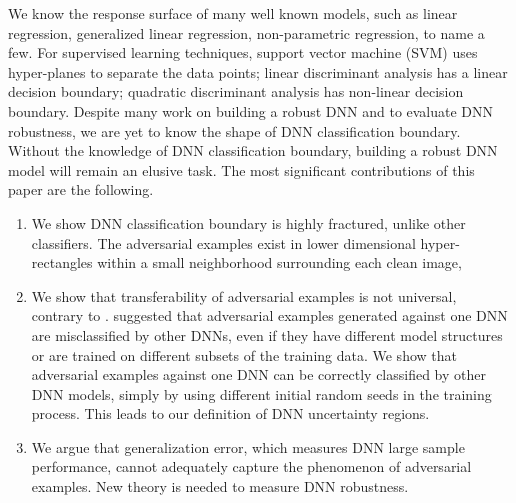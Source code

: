 \documentclass[12pt]{article}
\begin{document}
We know the response surface of many well known models, such as
linear regression, generalized linear regression, non-parametric regression,
to name a few. For supervised learning techniques, support vector
machine (SVM) uses hyper-planes to separate the data points; linear
discriminant analysis has a linear decision boundary; quadratic
discriminant analysis has non-linear decision boundary. Despite many work on
building a robust DNN and to evaluate DNN robustness, we are yet to
know the shape of DNN classification boundary.
Without the knowledge of DNN classification boundary, 
  building a robust DNN model will remain an elusive task. 
The most significant contributions of this paper are the following.
\begin{enumerate}
\item We show DNN classification boundary is highly fractured, unlike other
  classifiers. The adversarial examples exist
  in lower dimensional hyper-rectangles within
  a small neighborhood surrounding each clean image,

\item We show that transferability of adversarial
  examples is not universal, contrary to 
  \cite{attack-LBFGS,explain-adexample-2015,transferable-adexample-space-2017}. 
  \cite{attack-LBFGS,explain-adexample-2015,transferable-adexample-space-2017}
  suggested that adversarial examples generated against one DNN are 
  misclassified by other DNNs, even if they have different model
  structures or are trained on different subsets of the training
  data. We show that adversarial examples against one DNN can be
  correctly classified by other DNN models, simply by using different
  initial random seeds in the training process. This leads to our
  definition of DNN uncertainty regions.        
 
\item We argue that generalization
  error, which measures DNN large sample performance, 
  cannot adequately capture the phenomenon of adversarial examples. 
  New theory is needed to measure DNN robustness. 
 
\end{enumerate}  
\end{document}
